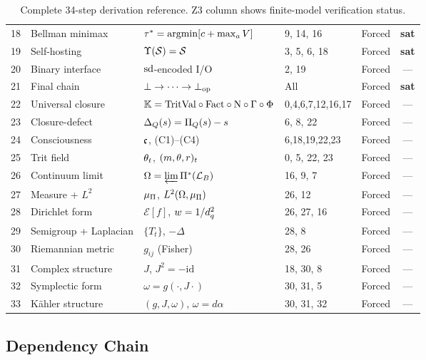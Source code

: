 \begin{table}[h!]
\begin{tabular}{@{}clllcc@{}}
\midrule
18 & Bellman minimax & $\tau^* = \argmin[c + \max_a V]$ & 9, 14, 16 & Forced & \textbf{sat} \\
19 & Self-hosting & $\Upsilon(\mathcal{S}) = \mathcal{S}$ & 3, 5, 6, 18 & Forced & \textbf{sat} \\
20 & Binary interface & $\mathrm{sd}$-encoded I/O & 2, 19 & Forced & --- \\
21 & Final chain & $\bot \to \cdots \to \bot_{\mathrm{op}}$ & All & Forced & \textbf{sat} \\
\midrule
22 & Universal closure & $\mathbb{K} = \mathrm{TritVal} \circ \mathrm{Fact} \circ \mathrm{N} \circ \Gamma \circ \Phi$ & 0,4,6,7,12,16,17 & Forced & --- \\
23 & Closure-defect & $\Delta_{Q}(s) = \Pi_Q(s) - s$ & 6, 8, 22 & Forced & --- \\
24 & Consciousness & $\mathfrak{c}$, (C1)--(C4) & 6,18,19,22,23 & Forced & --- \\
25 & Trit field & $\theta_t$, $(m, \theta, r)_t$ & 0, 5, 22, 23 & Forced & --- \\
\midrule
26 & Continuum limit & $\Omega = \varprojlim \Pi^*(\mathcal{L}_B)$ & 16, 9, 7 & Forced & --- \\
27 & Measure + $L^2$ & $\mu_\Pi$, $L^2(\Omega, \mu_\Pi)$ & 26, 12 & Forced & --- \\
28 & Dirichlet form & $\mathcal{E}[f]$, $w = 1/d_q^2$ & 26, 27, 16 & Forced & --- \\
29 & Semigroup + Laplacian & $\{T_t\}$, $-\Delta$ & 28, 8 & Forced & --- \\
30 & Riemannian metric & $g_{ij}$ (Fisher) & 28, 26 & Forced & --- \\
31 & Complex structure & $J$, $J^2 = -\mathrm{id}$ & 18, 30, 8 & Forced & --- \\
32 & Symplectic form & $\omega = g(\cdot, J\cdot)$ & 30, 31, 5 & Forced & --- \\
33 & K\"{a}hler structure & $(g, J, \omega)$, $\omega = d\alpha$ & 30, 31, 32 & Forced & --- \\
\bottomrule
\end{tabular}
\caption{Complete 34-step derivation reference. Z3 column shows finite-model verification status.}
\label{tab:derivation-reference}
\end{table}


\subsection{Dependency Chain}

